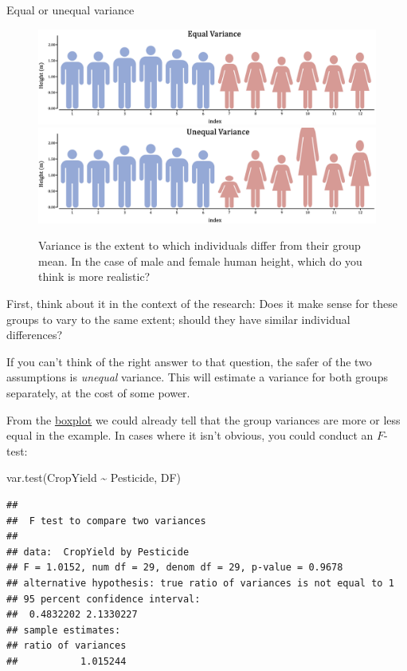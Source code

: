 \documentclass[
]{book}
\newenvironment{Shaded}{\begin{snugshade}}{\end{snugshade}}
\newcommand{\FunctionTok}[1]{\textcolor[rgb]{0.00,0.00,0.00}{#1}}
\newcommand{\NormalTok}[1]{#1}
\newcommand{\SpecialCharTok}[1]{\textcolor[rgb]{0.00,0.00,0.00}{#1}}
\begin{document}
Equal or unequal variance

\begin{figure}
\includegraphics[width=0.75\linewidth]{figures/sexHeight2} \includegraphics[width=0.75\linewidth]{figures/unequalVariance2} \caption{Variance is the extent to which individuals differ from their group mean. In the case of male and female human height, which do you think is more realistic?}\label{fig:unnamed-chunk-16}
\end{figure}

First, think about it in the context of the research: Does it make sense for these groups to vary to the same extent; should they have similar individual differences?

If you can't think of the right answer to that question, the safer of the two assumptions is \emph{unequal} variance. This will estimate a variance for both groups separately, at the cost of some power.

From the \protect\hyperlink{vis-t}{boxplot} we could already tell that the group variances are more or less equal in the example. In cases where it isn't obvious, you could conduct an \(F\)-test:

\begin{Shaded}
\begin{Highlighting}[]
\FunctionTok{var.test}\NormalTok{(CropYield }\SpecialCharTok{\textasciitilde{}}\NormalTok{ Pesticide, DF)}
\end{Highlighting}
\end{Shaded}

\begin{verbatim}
## 
##  F test to compare two variances
## 
## data:  CropYield by Pesticide
## F = 1.0152, num df = 29, denom df = 29, p-value = 0.9678
## alternative hypothesis: true ratio of variances is not equal to 1
## 95 percent confidence interval:
##  0.4832202 2.1330227
## sample estimates:
## ratio of variances 
##           1.015244
\end{verbatim}
\end{document}
